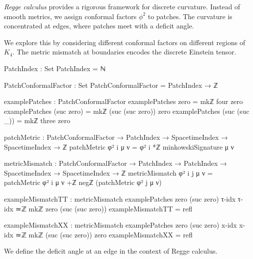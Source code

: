 \documentclass[11pt,a4paper]{book}
\begin{document}
\emph{Regge calculus} provides a rigorous framework for discrete curvature. Instead of smooth metrics, we assign conformal factors $\phi^2$ to patches. The curvature is concentrated at edges, where patches meet with a deficit angle.

We explore this by considering different conformal factors on different regions of $K_4$. The metric mismatch at boundaries encodes the discrete Einstein tensor.

\begin{code}
PatchIndex : Set
PatchIndex = ℕ

PatchConformalFactor : Set
PatchConformalFactor = PatchIndex → ℤ

examplePatches : PatchConformalFactor
examplePatches zero = mkℤ four zero
examplePatches (suc zero) = mkℤ (suc (suc zero)) zero
examplePatches (suc (suc _)) = mkℤ three zero

patchMetric : PatchConformalFactor → PatchIndex → 
              SpacetimeIndex → SpacetimeIndex → ℤ
patchMetric φ² i μ ν = φ² i *ℤ minkowskiSignature μ ν

metricMismatch : PatchConformalFactor → PatchIndex → PatchIndex → 
                 SpacetimeIndex → SpacetimeIndex → ℤ
metricMismatch φ² i j μ ν = 
  patchMetric φ² i μ ν +ℤ negℤ (patchMetric φ² j μ ν)

exampleMismatchTT : metricMismatch examplePatches zero (suc zero) τ-idx τ-idx 
                    ≃ℤ mkℤ zero (suc (suc zero))
exampleMismatchTT = refl

exampleMismatchXX : metricMismatch examplePatches zero (suc zero) x-idx x-idx 
                    ≃ℤ mkℤ (suc (suc zero)) zero
exampleMismatchXX = refl
\end{code}

We define the deficit angle at an edge in the context of Regge calculus.
\end{document}
